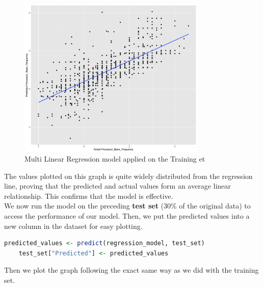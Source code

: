 \begin{figure}[H]
    \centering
    \includegraphics[width=0.8\textwidth]{graphics/train_test_graph.png}
    \caption{Multi Linear Regression model applied on the Training et}
\end{figure}

The values plotted on this graph is quite widely distributed from the regression line, proving that the predicted and actual values form an average linear relationship. This confirms that the model is effective.\\

We now run the model on the preceding \textbf{test set} (30\% of the original data) to access the performance of our model. Then, we put the predicted values into a new column in the dataset for easy plotting.\\

\begin{lstlisting}[language=R]
    predicted_values <- predict(regression_model, test_set)
    test_set["Predicted"] <- predicted_values
\end{lstlisting}

Then we plot the graph following the exact same way as we did with the training set.\\

